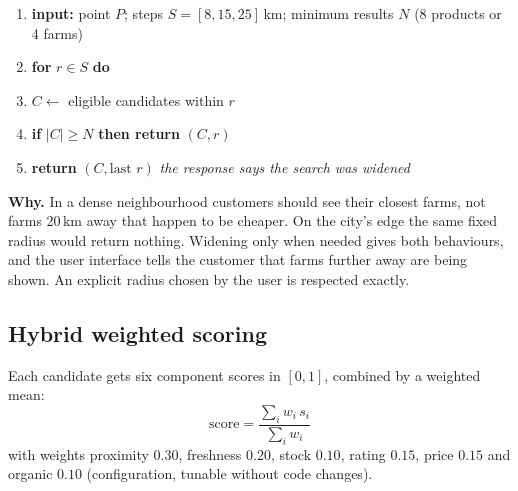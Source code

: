 \documentclass[11pt,a4paper]{article}
\newenvironment{pseudo}{\small\begin{enumerate}[label={\scriptsize\arabic*}, leftmargin=7mm, itemsep=1pt, topsep=3pt]}{\end{enumerate}}
\newcommand{\kw}[1]{\textbf{#1}}
\newcommand{\ind}{\hspace*{5mm}}
\begin{document}
\begin{algorithm}[H]
\caption{Search radius selection}
\begin{pseudo}
  \item \kw{input:} point $P$; steps $S = [8, 15, 25]$\,km; minimum results $N$ (8 products or 4 farms)
  \item \kw{for} $r \in S$ \kw{do}
  \item \ind $C \gets$ eligible candidates within $r$
  \item \ind \kw{if} $|C| \ge N$ \kw{then return} $(C, r)$
  \item \kw{return} $(C, \text{last } r)$ \hfill \emph{the response says the search was widened}
\end{pseudo}
\end{algorithm}

\noindent \textbf{Why.} In a dense neighbourhood customers should see their closest farms, not farms 20\,km away that happen to be cheaper. On the city's edge the same fixed radius would return nothing. Widening only when needed gives both behaviours, and the user interface tells the customer that farms further away are being shown. An explicit radius chosen by the user is respected exactly.

\subsection{Hybrid weighted scoring}

Each candidate gets six component scores in $[0,1]$, combined by a weighted mean:
\[
  \text{score} = \frac{\sum_i w_i\,s_i}{\sum_i w_i}
\]
with weights proximity $0.30$, freshness $0.20$, stock $0.10$, rating $0.15$, price $0.15$ and organic $0.10$ (configuration, tunable without code changes).
\end{document}
